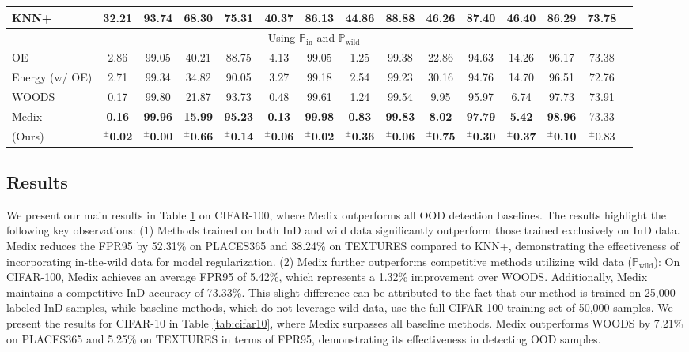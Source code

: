 \documentclass[10pt]{article} %
\theoremstyle{plain}
\theoremstyle{definition}
\begin{document}
\begin{table}[h]
{\begin{tabular}{lcccccccccccccc}
KNN+ & 32.21 & 93.74 & 68.30 & 75.31 & 40.37 & 86.13 & 44.86 & 88.88 & 46.26 & 87.40 & 46.40 & 86.29 & 73.78 \\
\hline
\multicolumn{14}{c}{Using $\mathbb{P}_{\text{in}}$ and $\mathbb{P}_{\text{wild}}$} \\
OE & 2.86 & 99.05 & 40.21 & 88.75 & 4.13 & 99.05 & 1.25 & 99.38 & 22.86 & 94.63 & 14.26 & 96.17 & 73.38 \\
Energy (w/ OE) & 2.71 & 99.34 & 34.82 & 90.05 & 3.27 & 99.18 & 2.54 & 99.23 & 30.16 & 94.76 & 14.70 & 96.51 & 72.76 \\
WOODS & {0.17} & {99.80} & 21.87 & 93.73 & 0.48 & {99.61} & {1.24} & {99.54} & 9.95 & 95.97 & 6.74 & 97.73 & 73.91 \\

\rowcolor[HTML]{DCEEFF} Medix   & \textbf{0.16} & \textbf{99.96} & \textbf{15.99} & \textbf{95.23} & \textbf{0.13} & \textbf{99.98} & \textbf{0.83}  & \textbf{99.83} & \textbf{8.02} & \textbf{97.79} & \textbf{5.42}  & \textbf{98.96} & 73.33 \\

\rowcolor[HTML]{DCEEFF} (Ours) & $^{\pm}$\textbf{0.02} & $^{\pm}$\textbf{0.00} & $^{\pm}$\textbf{0.66} & $^{\pm}$\textbf{0.14} & $^{\pm}$\textbf{0.06} & $^{\pm}$\textbf{0.02} & $^{\pm}$\textbf{0.36} & $^{\pm}$\textbf{0.06} & $^{\pm}$\textbf{0.75} & $^{\pm}$\textbf{0.30} & $^{\pm}$\textbf{0.37} & $^{\pm}$\textbf{0.10} & $^{\pm}${0.83} \\
\hline
\end{tabular}
}
\label{tab:cifar100}
\end{table}



\subsection{Results}
We present our main results in Table \ref{tab:cifar100} on CIFAR-100, where Medix outperforms all OOD detection baselines. 
The results highlight the following key observations: (1) Methods trained on both InD and wild data significantly outperform those trained exclusively on InD data. Medix reduces the FPR95 by 52.31\% on PLACES365 and 38.24\% on TEXTURES compared to KNN+, demonstrating the effectiveness of incorporating in-the-wild data for model regularization. (2) Medix further outperforms competitive methods utilizing wild data (\(\mathbb{P}_{\text{wild}}\)): On CIFAR-100, Medix achieves an average FPR95 of 5.42\%, which represents a 1.32\% improvement over WOODS. Additionally, Medix maintains a competitive InD accuracy of 73.33\%. This slight difference can be attributed to the fact that our method is trained on 25,000 labeled InD samples, while baseline methods, which do not leverage wild data, use the full CIFAR-100 training set of 50,000 samples.
We present the results for CIFAR-10 in Table \ref{tab:cifar10}, where Medix surpasses all baseline methods. Medix outperforms WOODS by 7.21\% on PLACES365 and 5.25\% on TEXTURES in terms of FPR95, demonstrating its effectiveness in detecting OOD samples.
\end{document}
